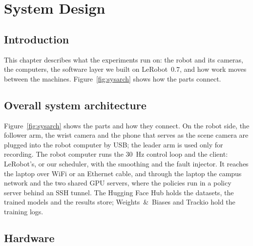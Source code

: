 \chapter{System Design}\label{ch:platform}

\section{Introduction}

This chapter describes what the experiments run on: the robot and its cameras, the computers, the software layer we
built on LeRobot~0.7, and how work moves between the machines. Figure~\ref{fig:sysarch} shows how
the parts connect.



\section{Overall system architecture}\label{sec:architecture-overview}
Figure~\ref{fig:sysarch} shows the parts and how they connect. On the robot side, the follower arm, the wrist camera
and the phone that serves as the scene camera are plugged into the robot computer by USB; the leader arm is used only
for recording. The robot computer runs the 30~Hz control loop and the client: LeRobot's, or our \drtc{} scheduler, with
the smoothing and the fault injector. It reaches the laptop over WiFi or an Ethernet cable, and through the laptop the
campus network and the two shared GPU servers, where the policies run in a policy server behind an SSH tunnel. The
Hugging Face Hub holds the datasets, the trained models and the results store; Weights~\&~Biases and Trackio hold the
training logs.


\section{Hardware}\label{sec:hardware}

